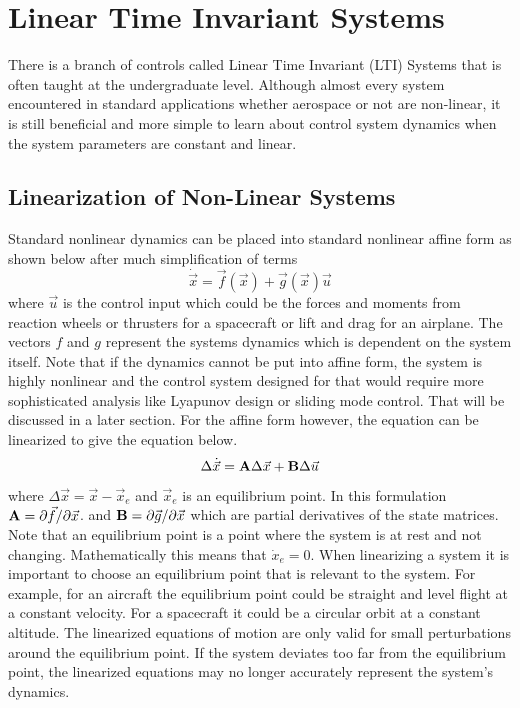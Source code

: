 \section{Linear Time Invariant Systems}

There is a branch of controls called Linear Time Invariant (LTI)
Systems that is often taught at the undergraduate level. Although
almost every system encountered in standard applications whether
aerospace or not are non-linear, it is still beneficial and more
simple to learn about control system dynamics when the system
parameters are constant and linear. 

\subsection{Linearization of Non-Linear Systems}

Standard nonlinear dynamics can be placed into standard
nonlinear affine form as shown below after much simplification of
terms
\begin{equation}
  \dot{\vec{x}} = \vec{f}(\vec{x}) + \vec{g}(\vec{x})\vec{u}
\end{equation}
where $\vec{u}$ is the control input which could be the forces and
moments from reaction wheels or thrusters for a spacecraft or lift and drag for an airplane. The vectors $f$ and $g$ represent the systems dynamics which is dependent on the system itself. Note that if the dynamics cannot be put into affine form, the system is highly nonlinear and the control system designed for that would require more sophisticated analysis like Lyapunov design or sliding mode control. That will be discussed in a later section. For the affine form however, the equation can be
linearized to give the equation below. 
\begin{equation}
  \Delta \dot{\vec{x}} = {\bf A}\Delta {\vec{x}} + {\bf B}\Delta \vec{u}
\end{equation}
where $\Delta \vec{x} = \vec{x} - \vec{x}_e$ and $\vec{x}_e$ is an
equilibrium point. In this formulation ${\bf A} = \partial \vec{f}/\partial \vec{x}$. and 
${\bf B} = \partial \vec{g}/\partial \vec{x}$ which are partial derivatives of the state matrices. Note that an equilibrium point is a point where the system is at rest and not changing. Mathematically this means that $\dot{x}_e = 0$. When linearizing a system it is important to choose an equilibrium point that is relevant to the system. For example, for an aircraft the equilibrium point could be straight and level flight at a constant velocity. For a spacecraft it could be a circular orbit at a constant altitude. The linearized equations of motion are only valid for small perturbations around the equilibrium point. If the system deviates too far from the equilibrium point, the linearized equations may no longer accurately represent the system's dynamics.


